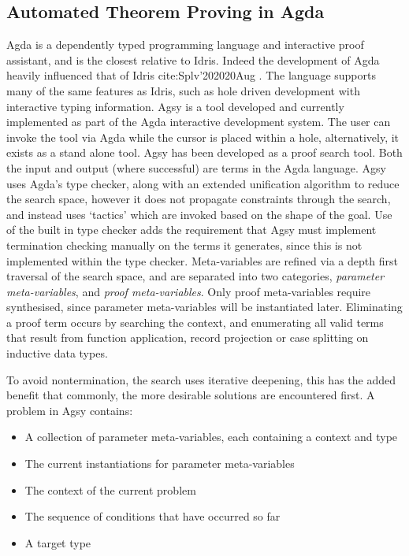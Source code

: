 \documentclass[a4paper]{article}
\begin{document}
\subsection{Automated Theorem Proving in Agda}
\label{sec:orge7e86bc}
Agda is a dependently typed programming language and interactive proof assistant, and is the closest relative to Idris.
Indeed the development of Agda heavily influenced that of Idris cite:Splv'202020Aug . The language supports many
of the same features as Idris, such as hole driven development with interactive typing information. 
Agsy is a tool developed and currently implemented as part of the Agda interactive development system.
The user can invoke the tool via Agda while the cursor is placed within a hole, alternatively, it exists as a stand alone tool.
Agsy has been developed as a proof search tool.
Both the input and output (where successful) are terms in the Agda language. Agsy uses Agda's type checker,
along with an extended unification algorithm to reduce the search space, however it does not propagate constraints
through the search, and instead uses `tactics' which are invoked based on the shape of the goal. Use of the built in type
checker adds the requirement that Agsy must implement termination checking manually on the terms it generates, since this 
is not implemented within the type checker. Meta-variables are refined via a depth first traversal of the search space, and are separated into 
two categories, \emph{parameter meta-variables}, and \emph{proof meta-variables}. Only proof meta-variables require synthesised, since parameter 
meta-variables will be instantiated later. Eliminating a proof term occurs by searching the context,
and enumerating all valid terms that result from function application, record projection or case splitting on inductive data types.

To avoid nontermination, the search uses iterative deepening, this has the added benefit that commonly, the
more desirable solutions are encountered first. A problem in Agsy contains:
\begin{itemize}
\item A collection of parameter meta-variables, each containing a context and type
\item The current instantiations for parameter meta-variables
\item The context of the current problem
\item The sequence of conditions that have occurred so far
\item A target type
\end{itemize}
\end{document}
